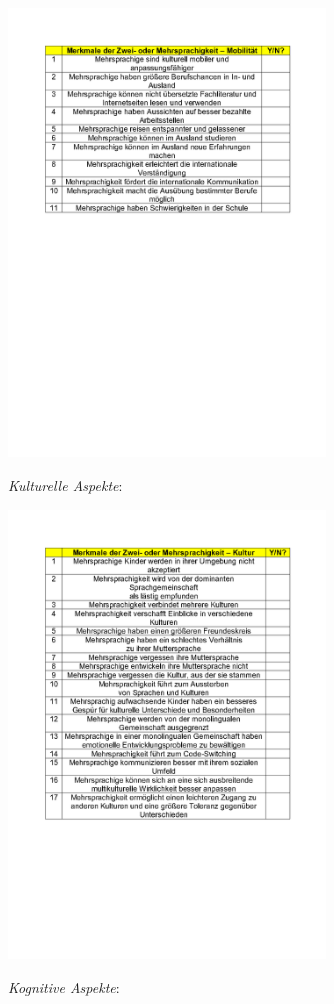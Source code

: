 \documentclass[
  letterpaper,
]{scrbook}
\begin{document}
\includegraphics[width=3.31in,height=\textheight]{./pictures/Mehrsprachigkeit_Behauptungen_Page1.png}

\emph{Kulturelle Aspekte}:

\includegraphics[width=3.31in,height=\textheight]{./pictures/Mehrsprachigkeit_Behauptungen_Page2.png}

\emph{Kognitive Aspekte}:
\end{document}
